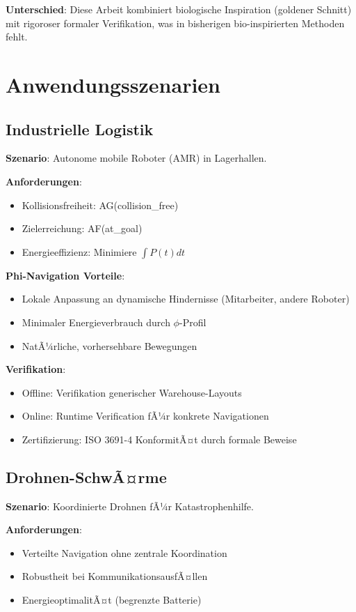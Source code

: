 ﻿\documentclass[a4paper,12pt]{article}
\theoremstyle{definition}
\begin{document}
\textbf{Unterschied}: Diese Arbeit kombiniert biologische Inspiration (goldener Schnitt) mit rigoroser formaler Verifikation, was in bisherigen bio-inspirierten Methoden fehlt.

\section{Anwendungsszenarien}

\subsection{Industrielle Logistik}

\textbf{Szenario}: Autonome mobile Roboter (AMR) in Lagerhallen.

\textbf{Anforderungen}:
\begin{itemize}
	\item Kollisionsfreiheit: AG(collision\_free)
	\item Zielerreichung: AF(at\_goal)
	\item Energieeffizienz: Minimiere $\int P(t) dt$
\end{itemize}

\textbf{Phi-Navigation Vorteile}:
\begin{itemize}
	\item Lokale Anpassung an dynamische Hindernisse (Mitarbeiter, andere Roboter)
	\item Minimaler Energieverbrauch durch $\phi$-Profil
	\item NatÃ¼rliche, vorhersehbare Bewegungen
\end{itemize}

\textbf{Verifikation}:
\begin{itemize}
	\item Offline: Verifikation generischer Warehouse-Layouts
	\item Online: Runtime Verification fÃ¼r konkrete Navigationen
	\item Zertifizierung: ISO 3691-4 KonformitÃ¤t durch formale Beweise
\end{itemize}

\subsection{Drohnen-SchwÃ¤rme}

\textbf{Szenario}: Koordinierte Drohnen fÃ¼r Katastrophenhilfe.

\textbf{Anforderungen}:
\begin{itemize}
	\item Verteilte Navigation ohne zentrale Koordination
	\item Robustheit bei KommunikationsausfÃ¤llen
	\item EnergieoptimalitÃ¤t (begrenzte Batterie)
\end{itemize}
\end{document}
